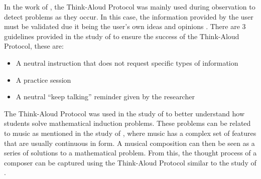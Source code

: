             In the work of \citet{ericsson1998study}, the Think-Aloud Protocol was mainly used during observation to detect problems as they occur. In this case, the information provided by the user must be validated due it being the user's own ideas and opinions \citep{ericsson1998study}. There are 3 guidelines provided in the study of \citet{ericsson1998study} to ensure the success of the Think-Aloud Protocol, these are: 
                       
            
            \begin{itemize}
            \item A neutral instruction that does not request specific types of information
            \item A practice session
            \item A neutral ``keep talking'' reminder given by the researcher
            \end{itemize}
            
            The Think-Aloud Protocol was used in the study of \citet{yu2011probing} to better understand how students solve mathematical induction problems. These problems can be related to music as mentioned in the study of \citet{dorfler2001time}, where music has a complex set of features that are usually continuous in form. A musical composition can then be seen as a series of solutions to a mathematical problem. From this, the thought process of a composer can be captured using the Think-Aloud Protocol similar to the study of \citet{yu2011probing}.
            
             

